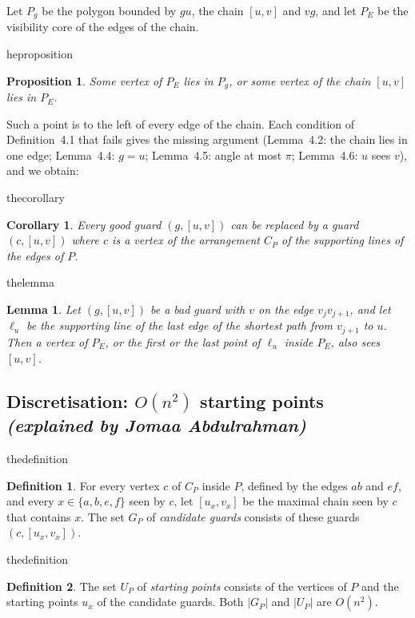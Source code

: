 \documentclass[11pt,a4paper]{article}
\newtheorem{lemma}{Lemma}
\newtheorem{proposition}{Proposition}
\newtheorem{corollary}{Corollary}
\theoremstyle{definition}
\newtheorem{definition}{Definition}
\theoremstyle{remark}
\newcommand{\paperthm}[2]{\expandafter\renewcommand\csname the#1\endcsname{#2}}
\newcommand{\by}[1]{\hfill{\small\textit{(explained by #1)}}}
\begin{document}
Let $P_g$ be the polygon bounded by $gu$, the chain $[u,v]$ and $vg$, and let $P_E$ be the visibility core of the edges of the chain.

\paperthm{proposition}{4.3}
\begin{proposition}
Some vertex of $P_E$ lies in $P_g$, or some vertex of the chain $[u,v]$ lies in $P_E$.
\end{proposition}

Such a point is to the left of every edge of the chain. Each condition of Definition~4.1 that fails gives the missing argument
(Lemma~4.2: the chain lies in one edge; Lemma~4.4: $g=u$; Lemma~4.5: angle at most $\pi$; Lemma~4.6: $u$ sees $v$), and we obtain:

\paperthm{corollary}{4.7}
\begin{corollary}
Every good guard $(g,[u,v])$ can be replaced by a guard $(c,[u,v])$ where $c$ is a vertex of the arrangement $C_P$ of the supporting lines of the edges of $P$.
\end{corollary}

\paperthm{lemma}{4.9}
\begin{lemma}
Let $(g,[u,v])$ be a bad guard with $v$ on the edge $v_jv_{j+1}$, and let $\ell_u$ be the supporting line of the last edge of the shortest path from $v_{j+1}$
to $u$. Then a vertex of $P_E$, or the first or the last point of $\ell_u$ inside $P_E$, also sees $[u,v]$.
\end{lemma}

\subsection[\texorpdfstring{Discretisation: $O(n^2)$ starting points}{Discretisation: O(n2) starting points}]{Discretisation: $O(n^2)$ starting points \by{Jomaa Abdulrahman}}

\paperthm{definition}{5.1}
\begin{definition}
For every vertex $c$ of $C_P$ inside $P$, defined by the edges $ab$ and $ef$, and every $x\in\{a,b,e,f\}$ seen by $c$, let $[u_x,v_x]$ be the maximal chain seen
by $c$ that contains $x$. The set $G_P$ of \emph{candidate guards} consists of these guards $(c,[u_x,v_x])$.
\end{definition}
\paperthm{definition}{5.2}
\begin{definition}
The set $U_P$ of \emph{starting points} consists of the vertices of $P$ and the starting points $u_x$ of the candidate guards. Both $|G_P|$ and $|U_P|$ are $O(n^2)$.
\end{definition}
\end{document}
